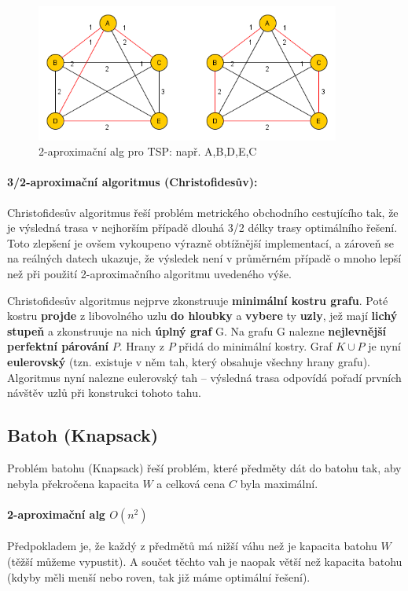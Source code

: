 \begin{figure}[h]
    \begin{center}
        \includegraphics[width=100mm]{09/images/tsp-2aprox}
    \end{center}
    \caption{2-aproximační alg pro TSP: např. A,B,D,E,C}
\end{figure}

\paragraph{3/2-aproximační algoritmus (Christofidesův):}
Christofidesův algoritmus řeší problém metrického obchodního cestujícího tak, že je výsledná trasa v nejhorším případě dlouhá 3/2 délky trasy optimálního řešení. Toto zlepšení je ovšem vykoupeno výrazně obtížnější implementací, a zároveň se na reálných datech ukazuje, že výsledek není v průměrném případě o mnoho lepší než při použití 2-aproximačního algoritmu uvedeného výše.

Christofidesův algoritmus nejprve zkonstruuje \textbf{minimální kostru grafu}. Poté kostru \textbf{projde} z libovolného uzlu \textbf{do hloubky} a \textbf{vybere} ty \textbf{uzly}, jež mají \textbf{lichý stupeň} a zkonstruuje na nich \textbf{úplný graf} G. Na grafu G nalezne \textbf{nejlevnější perfektní párování} $P$. Hrany z $P$ přidá do minimální kostry. Graf $K \cup P$ je nyní \textbf{eulerovský} (tzn. existuje v něm tah, který obsahuje všechny hrany grafu). Algoritmus nyní nalezne eulerovský tah – výsledná trasa odpovídá pořadí prvních návštěv uzlů při konstrukci tohoto tahu.

\subsection{Batoh (Knapsack)}
Problém batohu (Knapsack) řeší problém, které předměty dát do batohu tak, aby nebyla překročena kapacita $W$ a celková cena $C$ byla maximální.

\paragraph{2-aproximační alg $O(n^2)$} Předpokladem je, že každý z předmětů má nižší váhu než je kapacita batohu $W$ (těžší můžeme vypustit). A součet těchto vah je naopak větší než kapacita batohu (kdyby měli menší nebo roven, tak již máme optimální řešení).

